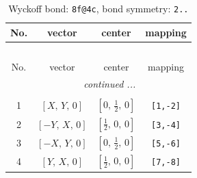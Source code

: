 \documentclass[fleqn,8pt]{jsarticle}
\begin{document}
\renewcommand{\arraystretch}{1.2}
\begin{longtable}{cccc}
\caption{Wyckoff bond: {\tt 8f@4c}, bond symmetry: {\tt 2..}}
 \\
 \hline \hline
No. & vector & center & mapping \\ \hline \endfirsthead

\multicolumn{3}{l}{\tablename\ \thetable{}} \\
 \hline \hline
No. & vector & center & mapping \\ \hline \endhead

 \hline \hline
\multicolumn{3}{r}{\footnotesize\it continued ...} \\ \endfoot

 \hline \hline
\multicolumn{3}{r}{} \\ \endlastfoot

1 & $\left[ X,\, Y,\, 0 \right]$ & $\left[ 0,\, \frac{1}{2},\, 0 \right]$ & {\tt [1,-2]} \\ \hline
2 & $\left[ - Y,\, X,\, 0 \right]$ & $\left[ \frac{1}{2},\, 0,\, 0 \right]$ & {\tt [3,-4]} \\ \hline
3 & $\left[ - X,\, Y,\, 0 \right]$ & $\left[ 0,\, \frac{1}{2},\, 0 \right]$ & {\tt [5,-6]} \\ \hline
4 & $\left[ Y,\, X,\, 0 \right]$ & $\left[ \frac{1}{2},\, 0,\, 0 \right]$ & {\tt [7,-8]} \\
\end{longtable}
\renewcommand{\arraystretch}{1.2}
\end{document}
